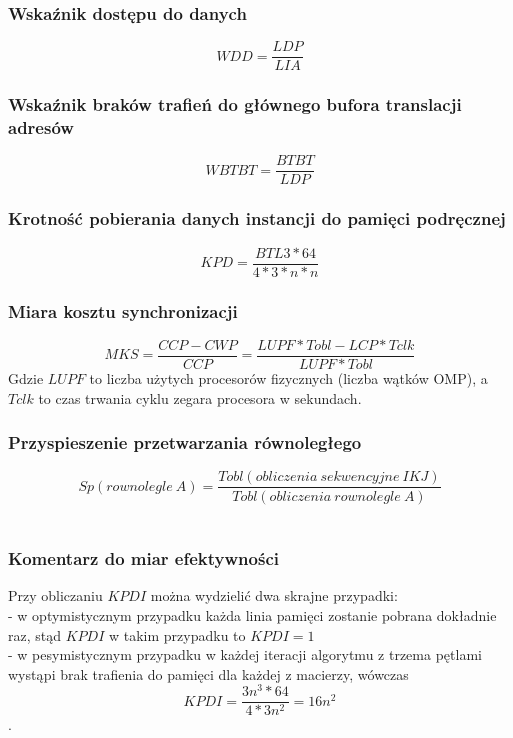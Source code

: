 \documentclass[10pt,a4paper]{article}
\begin{document}
\subsubsection*{Wskaźnik dostępu do danych}
\begin{equation}
	WDD = \frac{LDP}{LIA}
\end{equation}
\subsubsection*{Wskaźnik braków trafień do głównego bufora translacji adresów}
\begin{equation}
	WBTBT = \frac{BTBT}{LDP}
\end{equation}
\subsubsection*{Krotność pobierania danych instancji do pamięci podręcznej}
\begin{equation}
	KPD = \frac{BTL3 * 64}{4 * 3 * n * n}
\end{equation}
\subsubsection*{Miara kosztu synchronizacji}
\begin{equation}
	MKS = \frac{CCP - CWP}{CCP} = \frac{LUPF * Tobl - LCP * Tclk}{LUPF * Tobl}
\end{equation}
Gdzie $LUPF$ to liczba użytych procesorów fizycznych (liczba wątków OMP), a $Tclk$ 
to czas trwania cyklu zegara procesora w sekundach.
\subsubsection*{Przyspieszenie przetwarzania równoległego}
\begin{equation}
	Sp(rownolegle\: A) = \frac{Tobl(obliczenia \: sekwencyjne \: IKJ)}{Tobl(obliczenia \: rownolegle \: A)}
\end{equation}
\\
\subsubsection*{Komentarz do miar efektywności}
Przy obliczaniu $KPDI$ można wydzielić dwa skrajne przypadki: \\
- w optymistycznym przypadku każda linia pamięci zostanie pobrana dokładnie raz,
stąd $KPDI$ w takim przypadku to $KPDI = 1$\\
- w pesymistycznym przypadku w każdej iteracji algorytmu z trzema pętlami wystąpi
brak trafienia do pamięci dla każdej z macierzy, wówczas $$KPDI = \frac{3n^3 * 64}{4 * 3n^2}
= 16 n^2$$.
\end{document}
